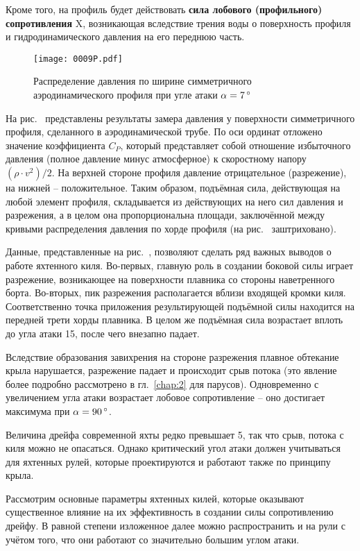 Кроме того, на профиль будет действовать \textbf{сила лобового (профильного) сопротивления}
\ve X, возникающая вследствие трения
воды о поверхность профиля и гидродинамического давления на его
переднюю часть.

\begin{figure}[htb]
  \centering
  \texttt{[image: 0009P.pdf]}
  \caption{Распределение давления по ширине симметричного аэродинамического профиля при угле атаки $\alpha = 7\,^\circ$}
  \label{fig:9}
\end{figure}

На рис.~ представлены результаты замера давления у поверхности
симметричного профиля, сделанного в аэродинамической трубе. По оси
ординат отложено значение коэффициента $C_P$, который представляет
собой отношение избыточного давления (полное давление минус
атмосферное) к скоростному напору $(\rho \cdot v^2) / 2$. На верхней
стороне профиля давление отрицательное (разрежение), на нижней \---
положительное. Таким образом, подъёмная сила, действующая на любой
элемент профиля, складывается из действующих на него сил давления и
разрежения, а в целом она пропорциональна площади, заключённой между
кривыми распределения давления по хорде профиля (на рис.~
заштриховано).

Данные, представленные на рис.~, позволяют сделать ряд важных
выводов о работе яхтенного киля. Во-первых, главную роль в создании
боковой силы играет разрежение, возникающее на поверхности плавника со
стороны наветренного борта. Во-вторых, пик разрежения располагается
вблизи входящей кромки киля. Соответственно точка приложения
результирующей подъёмной силы находится на передней трети хорды
плавника. В целом же подъёмная сила возрастает вплоть до угла атаки
15\gr, после чего внезапно падает.

Вследствие образования завихрения на стороне разрежения плавное
обтекание крыла нарушается, разрежение падает и происходит срыв потока
(это явление более подробно рассмотрено в гл.~\ref{chap:2} для
парусов). Одновременно с увеличением угла атаки возрастает лобовое
сопротивление \--- оно достигает максимума при $\alpha = 90\,^\circ$.

Величина дрейфа современной яхты редко превышает 5\gr, так что срыв,
потока с киля можно не опасаться. Однако критический угол атаки должен
учитываться для яхтенных рулей, которые проектируются и работают также
по принципу крыла.

Рассмотрим основные параметры яхтенных килей, которые оказывают
существенное влияние на их эффективность в создании силы сопротивлению
дрейфу. В равной степени изложенное далее можно распространить и на
рули с учётом того, что они работают со значительно большим углом
атаки.

